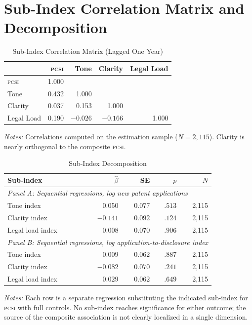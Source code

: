 \documentclass[12pt]{article}
\newcommand{\PCSI}{\textsc{pcsi}}
\begin{document}
\section{Sub-Index Correlation Matrix and Decomposition}
\label{app:channel}

\begin{table}[htbp]
\centering
\caption{Sub-Index Correlation Matrix (Lagged One Year)}
\label{tab:corrmatrix}
\begin{tabular}{lrrrr}
\toprule
 & \PCSI{} & Tone & Clarity & Legal Load \\
\midrule
\PCSI{} & 1.000 & & & \\
Tone & 0.432 & 1.000 & & \\
Clarity & 0.037 & 0.153 & 1.000 & \\
Legal Load & 0.190 & $-0.026$ & $-0.166$ & 1.000 \\
\bottomrule
\end{tabular}
\begin{tablenotes}
\small
\item \textit{Notes:} Correlations computed on the estimation sample ($N=2{,}115$).
Clarity is nearly orthogonal to the composite \PCSI{}.
\end{tablenotes}
\end{table}

\begin{table}[htbp]
\centering
\caption{Sub-Index Decomposition}
\label{tab:subindex}
\begin{threeparttable}
\begin{tabular}{lrrrr}
\toprule
Sub-index & $\hat\beta$ & SE & $p$ & $N$ \\
\midrule
\multicolumn{5}{l}{\textit{Panel A: Sequential regressions, log new patent applications}} \\[2pt]
Tone index & $0.050$ & $0.077$ & $.513$ & 2,115 \\
Clarity index & $-0.141$ & $0.092$ & $.124$ & 2,115 \\
Legal load index & $0.008$ & $0.070$ & $.906$ & 2,115 \\
\midrule
\multicolumn{5}{l}{\textit{Panel B: Sequential regressions, log application-to-disclosure index}} \\[2pt]
Tone index & $0.009$ & $0.062$ & $.887$ & 2,115 \\
Clarity index & $-0.082$ & $0.070$ & $.241$ & 2,115 \\
Legal load index & $0.029$ & $0.062$ & $.649$ & 2,115 \\
\bottomrule
\end{tabular}
\begin{tablenotes}
\small
\item \textit{Notes:} Each row is a separate regression substituting the indicated
sub-index for \PCSI{} with full controls. No sub-index reaches significance for
either outcome; the source of the composite association is not clearly localized
in a single dimension.
\end{tablenotes}
\end{threeparttable}
\end{table}
\end{document}
